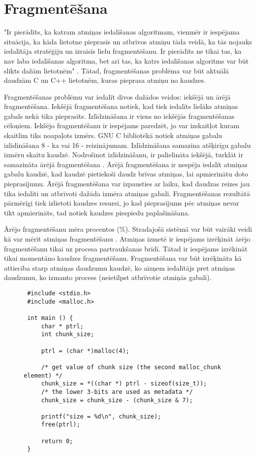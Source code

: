 \section{Fragmentēšana}

"Ir pierādīts, ka katram atmiņas iedalīšanas algoritmam, vienmēr ir iespējama situācija, ka kāda lietotne pieprasīs 
un atbrīvos atmiņu tāda veidā, ka tās nojauks iedalītāja stratēģiju un izraisīs lielu fragmentēšanu. 
Ir pierādīts ne tikai tas, ka nav laba iedalīšanas algoritma, bet arī tas, ka katrs iedalīšanas algoritms var būt slikts dažām lietotnēm" \cite{PWMS}.
Tātad, fragmentēšanas problēma var būt aktuālā daudzām C un C++ lietotnēm, kuras pieprasa atmiņu no kaudzes.

Fragmentēšanas problēmu var iedalīt divos dažādos veidos: iekšējā un ārējā fragmentēšana.
Iekšējā fragmentēšana notiek, kad tiek iedalīts lielāks atmiņas gabals nekā tika pieprasīts.
Izlīdzināšana ir viens no iekšējās fragmentēšanas cēloņiem.
Iekšējo fragmentēšanu ir iespējams paredzēt, jo var izskaitļot kuram skaitlim tiks noapaļots izmērs.
GNU C bibliotēkā notiek atmiņas gabalu izlidināšana 8 - ka vai 16 - reizinājumam.
Izlīdzināšana samazina atšķirīgu gabalu izmēru skaitu kaudzē.
Nodrošinot izlīdzināšanu, ir palielināta iekšējā, turklāt ir samazināta ārējā fragmentēšana \cite{RAN}.
Ārējā fragmentēšana ir nespēja iedalīt atmiņas gabalu kaudzē, kad kaudzē pietiekoši daudz brīvas atmiņas, lai apmierinātu doto pieprasījumu.
Ārējā fragmentēšana var izpausties ar laiku, kad daudzas reizes jau tika iedalīti un atbrīvoti dažāda izmēra atmiņas gabali.
Fragmentēšanas rezultātā pārmērīgi tiek izlietoti kaudzes resursi, jo kad pieprasījums pēc atmiņas nevar tikt apmierināts, tad notiek kaudzes piespiedu paplašināšana.

Ārējo fragmentēšanu mēra procentos (\%). 
Stradajošā sistēmā var būt vairāki veidi kā var mērīt atmiņas fragmentēšanu \cite{MSJ}. 
Atmiņas izmetē ir iespējams izrēķināt ārējo fragmentēšanu tikai uz procesa partraukšanas brīdī.
Tātad ir iespējams izrēkināt tikai momentāno kaudzes fragmentēšanu.
Fragmentēšana var būt izrēķināta kā attiecība starp atmiņas daudzumu kaudzē, ko aizņem iedalītājs pret atmiņas daudzumu, ko izmanto process (neietilpst atbrīvotie atmiņās gabali).


\begin{figure}[h]
\begin{lstlisting}
 #include <stdio.h>
 #include <malloc.h>

 int main () {
     char * ptrl;
     int chunk_size;

     ptrl = (char *)malloc(4);
 
     /* get value of chunk size (the second malloc_chunk element) */
     chunk_size = *((char *) ptrl - sizeof(size_t));
     /* the lower 3-bits are used as metadata */
     chunk_size = chunk_size - (chunk_size & 7);
 
     printf("size = %d\n", chunk_size);
     free(ptrl);
 
     return 0;
 }
\end{lstlisting}
\caption{\textbf{\fontsize{11}{12}\selectfont {Izmēra noteikšana iedalītām gabalam}}}
\end{figure}


